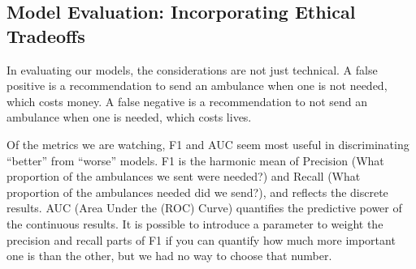 \subsection{Model Evaluation:  Incorporating Ethical Tradeoffs}

In evaluating our models, the considerations are not just technical.  A false positive is a recommendation to send an ambulance when one is not needed, which costs money.   A false negative is a recommendation to not send an ambulance when one is needed, which costs lives.  

Of the metrics we are watching, F1 and AUC seem most useful in discriminating ``better'' from ``worse'' models.  F1 is the harmonic mean of Precision (What proportion of the ambulances we sent were needed?) and Recall (What proportion of the ambulances needed did we send?), and reflects the discrete results.  AUC (Area Under the (ROC) Curve) quantifies the predictive power of the continuous results.  It is possible to introduce a parameter to weight the precision and recall parts of F1 if you can quantify how much more important one is than the other, but we had no way to choose that number.

